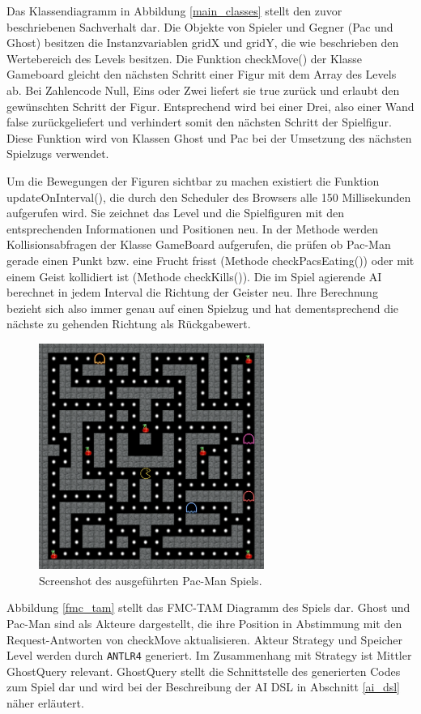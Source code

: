 \documentclass[conference]{IEEEtran}
\begin{document}
Das Klassendiagramm in Abbildung \ref{main_classes} stellt den zuvor beschriebenen Sachverhalt dar. Die Objekte von Spieler und Gegner (Pac und Ghost) besitzen die Instanzvariablen gridX und gridY, die wie beschrieben den Wertebereich des Levels besitzen. Die Funktion checkMove() der Klasse Gameboard gleicht den nächsten Schritt einer Figur mit dem Array des Levels ab. Bei Zahlencode Null, Eins oder Zwei liefert sie true zurück und erlaubt den gewünschten Schritt der Figur. Entsprechend wird bei einer Drei, also einer Wand false zurückgeliefert und verhindert somit den nächsten Schritt der Spielfigur. Diese Funktion wird von Klassen Ghost und Pac bei der Umsetzung des nächsten Spielzugs verwendet.

Um die Bewegungen der Figuren sichtbar zu machen existiert die Funktion updateOnInterval(), die durch den Scheduler des Browsers  alle 150 Millisekunden aufgerufen wird. Sie zeichnet das Level und die Spielfiguren mit den entsprechenden Informationen und Positionen neu. In der Methode werden Kollisionsabfragen der Klasse GameBoard aufgerufen, die prüfen ob Pac-Man gerade einen Punkt bzw. eine Frucht frisst (Methode checkPacsEating()) oder mit einem Geist kollidiert ist (Methode checkKills()). Die im Spiel agierende AI berechnet in jedem Interval die Richtung der Geister neu. Ihre Berechnung bezieht sich also immer genau auf einen Spielzug und hat dementsprechend die nächste zu gehenden Richtung als Rückgabewert.

\begin{figure}[!t]
\centering
\includegraphics[width=2.9in]{screenshot.png}

\caption{Screenshot des ausgeführten Pac-Man Spiels.}
\label{pac_screen}
\end{figure}

Abbildung \ref{fmc_tam} stellt das FMC-TAM Diagramm des Spiels dar. Ghost und Pac-Man sind als Akteure dargestellt, die ihre Position in Abstimmung mit den Request-Antworten von checkMove aktualisieren. Akteur Strategy und Speicher Level werden durch \texttt{ANTLR4} generiert. Im Zusammenhang mit Strategy ist Mittler GhostQuery relevant. GhostQuery stellt die Schnittstelle des generierten Codes zum Spiel dar und wird bei der Beschreibung der AI DSL in Abschnitt \ref{ai_dsl} näher erläutert.
\end{document}
